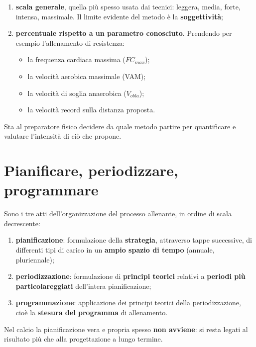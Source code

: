 \begin{enumerate}
  \item \textbf{scala generale}, quella più spesso usata dai tecnici: leggera, media, forte,
    intensa, massimale. Il limite evidente del metodo è la \textbf{soggettività};
  \item \textbf{percentuale rispetto a un parametro conosciuto}. Prendendo per esempio
    l'allenamento di resistenza:
    \begin{itemize}
      \item la frequenza cardiaca massima ($FC_{max}$);
      \item la velocità aerobica massimale (VAM);
      \item la velocità di soglia anaerobica ($V_{obla}$);
      \item la velocità record sulla distanza proposta.
    \end{itemize}
\end{enumerate}

Sta al preparatore fisico decidere da quale metodo partire per quantificare e valutare l'intensità
di ciò che propone.

\section{Pianificare, periodizzare, programmare}

Sono i tre atti dell'organizzazione del processo allenante, in ordine di scala decrescente:

\begin{enumerate}
  \item \textbf{pianificazione}: formulazione della \textbf{strategia}, attraverso tappe successive,
    di differenti tipi di carico in un \textbf{ampio spazio di tempo} (annuale, pluriennale);
  \item \textbf{periodizzazione}: formulazione di \textbf{principi teorici} relativi a
    \textbf{periodi più particolareggiati} dell'intera pianificazione;
  \item \textbf{programmazione}: applicazione dei principi teorici della periodizzazione, cioè la
    \textbf{stesura del programma} di allenamento.
\end{enumerate}

Nel calcio la pianificazione vera e propria spesso \textbf{non avviene}: si resta legati al
risultato più che alla progettazione a lungo termine.

